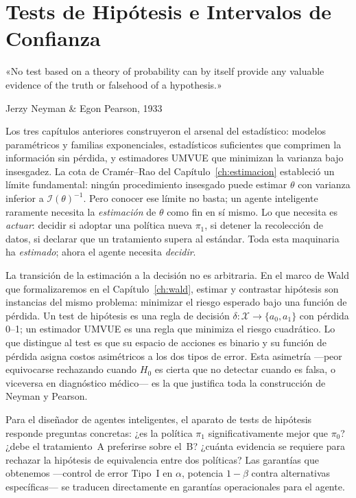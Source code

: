 
\chapter{Tests de Hipótesis e Intervalos de Confianza}
\label{ch:tests}

\epigraph{«No test based on a theory of probability can by itself provide
	any valuable evidence of the truth or falsehood of a hypothesis.»}
{Jerzy Neyman \& Egon Pearson, 1933}

Los tres capítulos anteriores construyeron el arsenal del estadístico: modelos
paramétricos y familias exponenciales, estadísticos suficientes que comprimen la
información sin pérdida, y estimadores UMVUE que minimizan la varianza bajo
insesgadez. La cota de Cramér--Rao del Capítulo~\ref{ch:estimacion} estableció un
límite fundamental: ningún procedimiento insesgado puede estimar $\theta$ con
varianza inferior a $\mathcal{I}(\theta)^{-1}$. Pero conocer ese límite no basta;
un agente inteligente raramente necesita la \emph{estimación} de $\theta$ como fin
en sí mismo. Lo que necesita es \emph{actuar}: decidir si adoptar una política nueva
$\pi_1$, si detener la recolección de datos, si declarar que un tratamiento supera
al estándar. Toda esta maquinaria ha \emph{estimado}; ahora el agente necesita
\emph{decidir}.

La transición de la estimación a la decisión no es arbitraria. En el marco de
Wald que formalizaremos en el Capítulo~\ref{ch:wald}, estimar y contrastar hipótesis
son instancias del mismo problema: minimizar el riesgo esperado bajo una función de
pérdida. Un test de hipótesis es una regla de decisión $\delta:\mathcal{X}\to\{a_0,a_1\}$
con pérdida 0--1; un estimador UMVUE es una regla que minimiza el riesgo cuadrático.
Lo que distingue al test es que su espacio de acciones es binario y su función de
pérdida asigna costos asimétricos a los dos tipos de error. Esta asimetría ---peor
equivocarse rechazando cuando $H_0$ es cierta que no detectar cuando es falsa, o
viceversa en diagnóstico médico--- es la que justifica toda la construcción de
Neyman y Pearson.

Para el diseñador de agentes inteligentes, el aparato de tests de hipótesis
responde preguntas concretas: ¿es la política $\pi_1$ significativamente mejor que
$\pi_0$? ¿debe el tratamiento~A preferirse sobre el~B? ¿cuánta evidencia se requiere
para rechazar la hipótesis de equivalencia entre dos políticas? Las garantías
que obtenemos ---control de error Tipo~I en $\alpha$, potencia $1-\beta$ contra
alternativas específicas--- se traducen directamente en garantías operacionales
para el agente.

